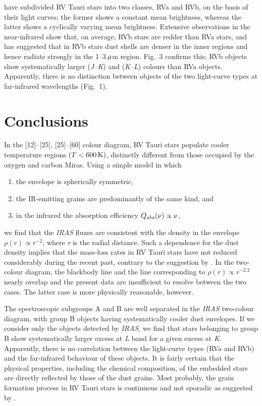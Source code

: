 \documentclass[useAMS,usenatbib]{mn2e}
\begin{document}
\citet{b13} have subdivided RV Tauri stars into two classes, RVa
and RVb, on the basis of their light curves; the former shows a
constant mean  brightness, whereas the latter shows a cyclically
varying  mean brightness. Extensive observations in the
near-infrared show that, on average, RVb stars are redder than RVa
stars, and \citet{b15} has suggested that in RVb stars dust shells
are denser in the inner regions and hence radiate strongly in the
1--3$\,\mu$m region. Fig.~3 confirms this; RVb objects show
systematically larger ({\it J--K\/}) and ({\it K--L\/}) colours
than RVa objects. Apparently, there is no distinction between
objects of the two light-curve types at far-infrared wavelengths
(Fig.~1).

\section{Conclusions}

In the [12]--[25], [25]--[60] colour diagram, RV Tauri stars populate
cooler temperature regions $(T<600 \,{\mathrm{K}})$, distinctly different from
those occupied by the oxygen and carbon Miras. Using a simple model
in which
\begin{enumerate}
  \item the envelope is spherically symmetric,
  \item the IR-emitting grains are predominantly of the same kind, and
  \item in the infrared the absorption efficiency $Q_{{\mathrm{abs}}}
        (\nu)\propto\nu$,
\end{enumerate}
we find that the {\it IRAS\/} fluxes are consistent with the
density in the envelope $\rho(r)\propto r^{-2}$, where {\it r\/}
is the radial distance. Such a dependence for the dust density
implies that the mass-loss rates in RV Tauri stars have not
reduced considerably during the recent past, contrary to the
suggestion by \citet{b12}. In the two-colour diagram, the
blackbody line and the line corresponding to $\rho(r)\propto
r^{-2.2}$ nearly overlap and the present data are insufficient to
resolve between the two cases. The latter case is more physically
reasonable, however.

The spectroscopic subgroups A and B are well separated in  the
{\it IRAS\/} two-colour diagram, with group B objects  having
systematically cooler dust envelopes. If we consider only the
objects detected by {\it IRAS}, we find that stars belonging to
group B show systematically larger excess at {\it L\/} band for a
given excess at {\it K}. Apparently, there is no correlation
between the light-curve types (RVa and RVb) and the far-infrared
behaviour of these objects. It is fairly certain that the physical
properties, including the chemical composition, of the embedded
stars are directly reflected by those of the dust grains. Most
probably, the grain formation process in RV Tauri stars is
continuous and not sporadic as suggested by \citet{b9}.
\end{document}
